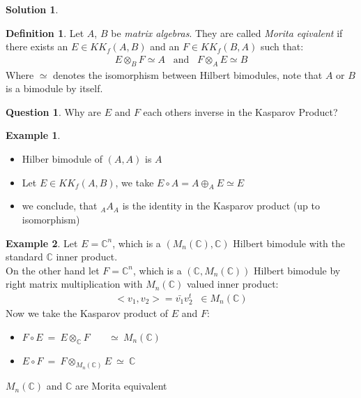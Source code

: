 \documentclass[a4paper]{article}
\theoremstyle{definition}
\newtheorem{definition}{Definition}
\theoremstyle{definition}
\newtheorem{question}{Question}
\theoremstyle{definition}
\newtheorem{example}{Example}
\theoremstyle{theorem}
\theoremstyle{theorem}
\theoremstyle{theorem}
\theoremstyle{definition}
\newtheorem{solution}{Solution}
\begin{document}
\begin{solution}
\end{solution}

\begin{definition}
    Let $A$, $B$ be \textit{matrix algebras}. They are called \textit{Morita eqivalent} if there
    exists an $E \in KK_f(A, B)$ and an $F \in KK_f(B, A)$ such that:
    \begin{align*}
        E \otimes _B F \simeq A \;\;\; \text{and} \;\;\; F \otimes _A E \simeq B
    \end{align*}
    Where $\simeq$ denotes the isomorphism between Hilbert bimodules, note that $A$ or $B$ is a bimodule by
    itself.
\end{definition}

\begin{question}
    Why are $E$ and $F$ each others inverse in the Kasparov Product?
\end{question}

\begin{example}
    \
    \begin{itemize}
        \item Hilber bimodule of $(A,A)$ is $A$
        \item Let $E \in KK_f(A,B)$, we take $E \circ A = A\oplus _A E \simeq E$
        \item we conclude, that $_A A_A$ is the identity in the Kasparov product (up to isomorphism)
    \end{itemize}
\end{example}

\begin{example}
    Let $E = \mathbb{C}^n$, which is a $(M_n(\mathbb{C}), \mathbb{C})$ Hilbert bimodule with the
    standard $\mathbb{C}$ inner product.\\
    On the other hand let $F = \mathbb{C}^n$, which is a $(\mathbb{C}, M_n(\mathbb{C}))$ Hilbert
    bimodule by right matrix multiplication with $M_n(\mathbb{C})$ valued inner product:
    \begin{align*}
        <v_1, v_2>=\bar{v_1}v_2^t \;\; \in M_n(\mathbb{C})
    \end{align*}
    Now we take the Kasparov product of $E$ and $F$:
    \begin{itemize}
        \item $F\circ E\ =\  E\otimes _{\mathbb{C}}F\ \;\;\;\;\;\; \simeq \  M_n(\mathbb{C})$
        \item $E\circ F\ =\ F\otimes _{M_n(\mathbb{C})}E\ \simeq\ \mathbb{C}$
    \end{itemize}
    $M_n(\mathbb{C})$ and $\mathbb{C}$ are Morita equivalent
\end{example}
\end{document}
